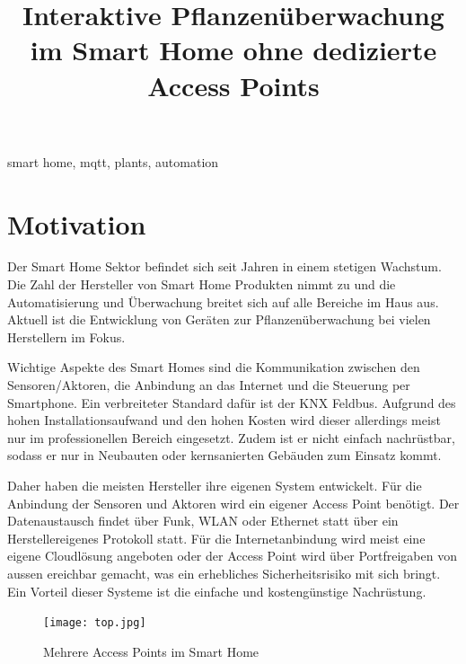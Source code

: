\documentclass[conference]{IEEEtran}
\begin{document}
\title{Interaktive Pflanzenüberwachung im Smart Home ohne dedizierte Access Points \\

}

\author{
}

\maketitle



\begin{IEEEkeywords}
smart home, mqtt, plants, automation
\end{IEEEkeywords}
\section{Motivation}
Der Smart Home Sektor befindet sich seit Jahren in einem stetigen Wachstum. Die Zahl der Hersteller von Smart Home Produkten nimmt zu und die Automatisierung und Überwachung breitet sich auf alle Bereiche im Haus aus. Aktuell ist die Entwicklung von Geräten zur Pflanzenüberwachung bei vielen Herstellern im Fokus. 


Wichtige Aspekte des Smart Homes sind die Kommunikation zwischen den Sensoren/Aktoren, die Anbindung an das Internet und die Steuerung per Smartphone. Ein verbreiteter Standard dafür ist der KNX Feldbus. Aufgrund des hohen Installationsaufwand und den hohen Kosten wird dieser allerdings meist nur im professionellen Bereich eingesetzt. Zudem ist er nicht einfach nachrüstbar, sodass er nur in Neubauten oder kernsanierten Gebäuden zum Einsatz kommt.


Daher haben die meisten Hersteller ihre eigenen System entwickelt. Für die Anbindung der Sensoren und Aktoren wird ein eigener Access Point benötigt. Der Datenaustausch findet über Funk, WLAN oder Ethernet statt über ein Herstellereigenes Protokoll statt. Für die Internetanbindung wird meist eine eigene Cloudlösung angeboten oder der Access Point wird über Portfreigaben von aussen ereichbar gemacht, was ein erhebliches Sicherheitsrisiko mit sich bringt. Ein Vorteil dieser Systeme ist die einfache und kostengünstige Nachrüstung. 
\begin{figure}[h]
    \centering
    \texttt{[image: top.jpg]}
    \caption{Mehrere Access Points im Smart Home }
    \label{fig:top}
\end{figure}
\end{document}
